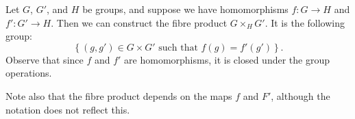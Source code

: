 \documentclass[12pt]{article}
\begin{document}
Let $G$, $G'$, and $H$ be groups, and suppose we have homomorphisms $f:G\to H$ and $f':G'\to H$. Then we can construct the fibre product $G\times_H G'$.  It is the following group:
\[
\left\{(g,g') \in G\times G' \text{ such that } f(g)=f'(g')\right\}.
\]
Observe that since $f$ and $f'$ are homomorphisms, it is closed under the group operations. 

Note also that the fibre product depends on the maps $f$ and $F'$, although the notation does not reflect this.
\end{document}
